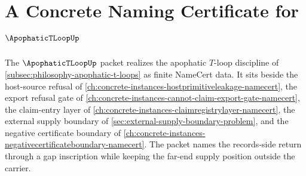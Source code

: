 \chapter{A Concrete Naming Certificate for $\ApophaticTLoopUp$}
\label{ch:concrete-instances-apophatic-t-loop-namecert}

The $\ApophaticTLoopUp$ packet realizes the apophatic $T$-loop discipline of \autoref{subsec:philosophy-apophatic-t-loops} as finite NameCert data. It sits beside the host-source refusal of \autoref{ch:concrete-instances-hostprimitiveleakage-namecert}, the export refusal gate of \autoref{ch:concrete-instances-cannot-claim-export-gate-namecert}, the claim-entry layer of \autoref{ch:concrete-instances-claimregistrylayer-namecert}, the external supply boundary of \autoref{sec:external-supply-boundary-problem}, and the negative certificate boundary of \autoref{ch:concrete-instances-negativecertificateboundary-namecert}. The packet names the records-side return through a gap inscription while keeping the far-end supply position outside the carrier.

